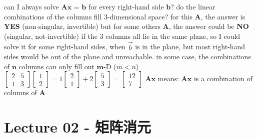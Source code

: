 \documentclass[12pt, a4paper]{article}
\begin{document}
can I always solve ${\mathbf{A}}$${\mathbf{x}}$ = ${\mathbf{b}}$ for every right-hand side ${\mathbf{b}}$?
\newline
do the linear combinations of the columns fill 3-dimensional space?
\newline
{\textcolor{anhao-purple}{for this ${\mathbf{A}}$, the answer is {\bf{YES}} (non-singular, invertible)}}
\newline
{\textcolor{anhao-purple}{but for some others ${\mathbf{A}}$, the answer could be {\bf{NO}} (singular, not-invertible)}}
\vspace{14pt}
\newline
if the 3 columns all lie in the same plane, 
\newline
so I could solve it for some right-hand sides, when ${\overrightarrow{b}}$ is in the plane,
\newline
but most right-hand sides would be out of the plane and unreachable.
\vspace{14pt}
\newline
in some case, the combinations of ${\mathbf{n}}$ columns can only fill out ${\mathbf{m}}$-D ($m < n$)
\vspace{14pt}
\newline
\begin{math}
\begin{bmatrix}
	2 & 5 \\
	1 & 3 
\end{bmatrix}
\begin{bmatrix}
	1 \\
	2 
\end{bmatrix}
 = 
1
\begin{bmatrix}
	2 \\
	1 
\end{bmatrix}
 + 
2
\begin{bmatrix}
	5 \\
	3 
\end{bmatrix}
 = 
\begin{bmatrix}
	12 \\
	7 
\end{bmatrix}
\end{math}
\newline
${\mathbf{A}}$${\mathbf{x}}$ means: ${\mathbf{A}}$${\mathbf{x}}$ is a combination of columns of ${\mathbf{A}}$

\newpage
\section{Lecture 02 - 矩阵消元}
\pagestyle{fancy}
\lhead{}
\rhead{}
\end{document}
